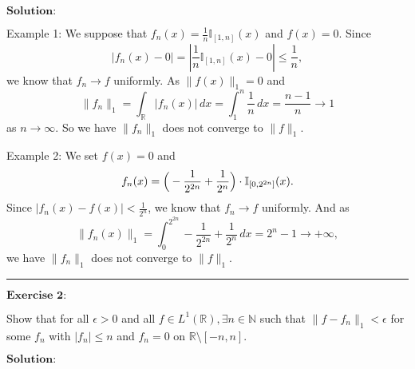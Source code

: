 \documentclass[12pt]{article}
\begin{document}
\vspace{8pt}

$\textbf{Solution:}$

Example 1: We suppose that $f_{n}(x) = \frac{1}{n} \mathbb{I}_{[1, n]} (x)$ and $f(x) = 0$. Since
\begin{equation*}
    |f_{n}(x) - 0| = |\frac{1}{n} \mathbb{I}_{[1, n]} (x) - 0| \leq \frac{1}{n},
\end{equation*}
we know that $f_{n} \to f$ uniformly. As $\|f(x)\|_{1} = 0$ and 
\begin{equation*}
    \|f_{n}\|_{1} = \int_{\mathbb{R}}^{} |f_{n}(x)| \, d x = \int_{1}^{n} \frac{1}{n} \, d x = \frac{n-1}{n} \to 1
\end{equation*}
as $n \to \infty$. So we have $\|f_{n}\|_{1}$ does not converge to $\|f\|_{1}$.

Example 2: We set $f(x) = 0$ and 
\begin{equation*}
    f_{n}(x) = \Big{(} - \frac{1}{2^{2n}} + \frac{1}{2^{n}} \Big{)} \cdot \mathbb{I}_{[0, 2^{2n}]} (x).
\end{equation*}
Since $|f_{n}(x) - f(x)| < \frac{1}{2^{n}}$, we know that $f_{n} \to f$ uniformly. And as
\begin{equation*}
    \|f_{n}(x)\|_{1} = \int_{0}^{2^{2n}}  - \frac{1}{2^{2n}} + \frac{1}{2^{n}} \, d x = 2^{n} - 1 \to + \infty,
\end{equation*}
we have $\|f_{n}\|_{1}$ does not converge to $\|f\|_{1}$.


\noindent\rule[0.25\baselineskip]{\textwidth}{0.5pt}

\vspace{8pt}

$\textbf{Exercise 2:}$

Show that for all $\epsilon > 0$ and all $f \in L^{1}(\mathbb{R}), \exists n \in \mathbb{N}$ such that $\|f - f_{n}\|_{1} < \epsilon$ for some $f_{n}$ with $|f_{n}| \leq n$ and $f_{n} = 0$ on $\mathbb{R} \setminus [-n, n]$.
 
\vspace{8pt}
$\textbf{Solution:}$
\end{document}
